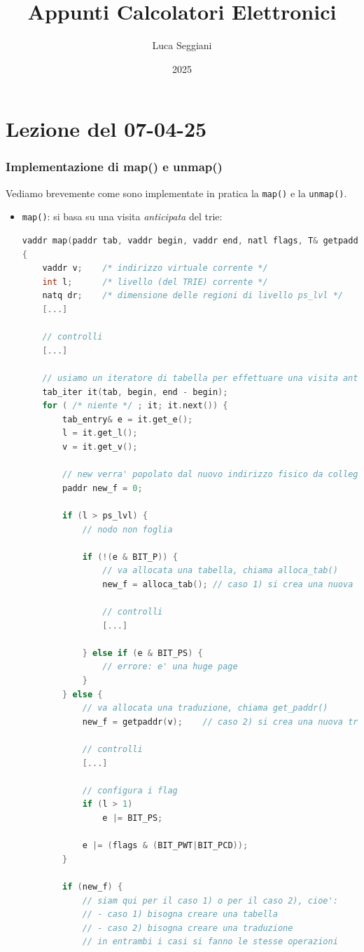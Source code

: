 \documentclass[a4paper,11pt]{article}
\title{Appunti Calcolatori Elettronici}
\author{Luca Seggiani}
\date{2025}
\begin{document}
\section{Lezione del 07-04-25}

\thispagestyle{empty}
\pagestyle{fancy}


\subsubsection{Implementazione di map() e unmap()}
Vediamo brevemente come sono implementate in pratica la \lstinline|map()| e la \lstinline|unmap()|.
\begin{itemize}
	\item \lstinline|map()|: si basa su una visita \textit{anticipata} del trie:
\begin{lstlisting}[language=C++, style=codestyle]	
vaddr map(paddr tab, vaddr begin, vaddr end, natl flags, T& getpaddr, int ps_lvl = 1)
{
	vaddr v;	/* indirizzo virtuale corrente */
	int l;		/* livello (del TRIE) corrente */
	natq dr;	/* dimensione delle regioni di livello ps_lvl */
	[...]

	// controlli
	[...]

	// usiamo un iteratore di tabella per effettuare una visita anticipata
	tab_iter it(tab, begin, end - begin);
	for ( /* niente */ ; it; it.next()) {
		tab_entry& e = it.get_e();
		l = it.get_l();
		v = it.get_v();
		
		// new verra' popolato dal nuovo indirizzo fisico da collegare a una tabella o a una traduzione, indistintamente 
		paddr new_f = 0;

		if (l > ps_lvl) {
			// nodo non foglia

			if (!(e & BIT_P)) {
				// va allocata una tabella, chiama alloca_tab()
				new_f = alloca_tab(); // caso 1) si crea una nuova tabella 
				
				// controlli
				[...]

			} else if (e & BIT_PS) {
				// errore: e' una huge page
			}
		} else {
			// va allocata una traduzione, chiama get_paddr()
			new_f = getpaddr(v);	// caso 2) si crea una nuova traduzione

			// controlli
			[...]

			// configura i flag
			if (l > 1)
				e |= BIT_PS;

			e |= (flags & (BIT_PWT|BIT_PCD));
		}

		if (new_f) {
			// siam qui per il caso 1) o per il caso 2), cioe':
			// - caso 1) bisogna creare una tabella
			// - caso 2) bisogna creare una traduzione
			// in entrambi i casi si fanno le stesse operazioni
			

\end{lstlisting}
\end{itemize}
\end{document}
